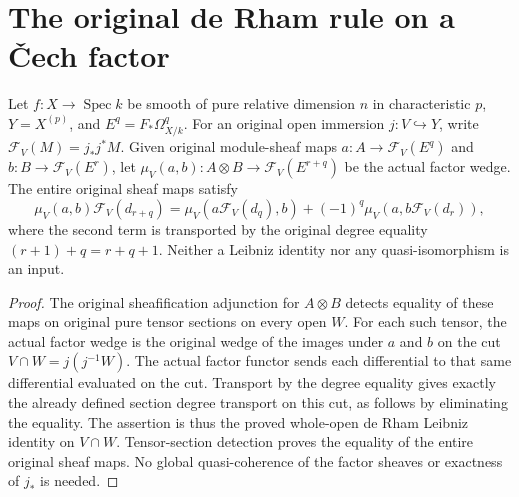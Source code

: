 \section{The original de Rham rule on a \v Cech factor}
\label{sec:di-cech-factor-derham-leibniz}

\begin{lemma}
\label{lem:di-cech-factor-derham-leibniz}
\leanok
{}
Let $f:X\to\operatorname{Spec}k$ be smooth of pure relative dimension
$n$ in characteristic $p$, $Y=X^{(p)}$, and $E^q=F_*\Omega^q_{X/k}$.
For an original open immersion $j:V\hookrightarrow Y$, write
$\mathcal F_V(M)=j_*j^*M$. Given original module-sheaf maps
$a:A\to\mathcal F_V(E^q)$ and $b:B\to\mathcal F_V(E^r)$, let
$\mu_V(a,b):A\otimes B\to\mathcal F_V(E^{r+q})$ be the actual
factor wedge. The entire original sheaf maps satisfy
\[
 \mu_V(a,b)\mathcal F_V(d_{r+q})
 =\mu_V(a\mathcal F_V(d_q),b)
    +(-1)^q\mu_V(a,b\mathcal F_V(d_r)),
\]
where the second term is transported by the original degree equality
$(r+1)+q=r+q+1$. Neither a Leibniz identity nor any quasi-isomorphism
is an input.
\end{lemma}
\begin{proof}
The original sheafification adjunction for $A\otimes B$ detects equality
of these maps on original pure tensor sections on every open $W$.
For each such tensor, the actual factor wedge is the original wedge
of the images under $a$ and $b$ on the cut
$V\cap W=j(j^{-1}W)$. The actual factor functor sends each differential
to that same differential evaluated on the cut. Transport by the degree
equality gives exactly the already defined section degree transport on
this cut, as follows by eliminating the equality. The assertion is thus
the proved whole-open de Rham Leibniz identity on $V\cap W$.
Tensor-section detection proves the equality of the entire original
sheaf maps. No global quasi-coherence of the factor sheaves or exactness
of $j_*$ is needed.
\end{proof}
